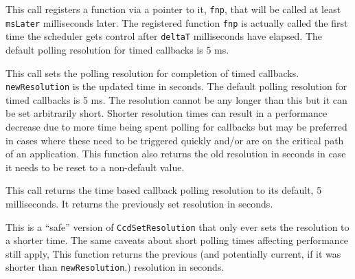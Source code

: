 This call registers a function via a pointer to it, {\tt fnp},  that will be
called at least {\tt msLater} milliseconds later. 
The registered function {\tt fnp} is actually called the first time the
scheduler gets control after {\tt deltaT} milliseconds have elapsed. 
The default polling resolution for timed callbacks is 5 ms.


This call sets the polling resolution for completion of timed callbacks.
{\tt newResolution} is the updated time in seconds. The default polling resolution
for timed callbacks is 5 ms. The resolution cannot be any longer than this but
it can be set arbitrarily short. Shorter resolution times can result in a
performance decrease due to more time being spent polling for callbacks but may be
preferred in cases where these need to be triggered quickly and/or are on the
critical path of an application.
This function also returns the old resolution in seconds in case it needs to be
reset to a non-default value.


This call returns the time based callback polling resolution to its default,
5 milliseconds. It returns the previously set resolution in seconds.


This is a ``safe'' version of {\tt CcdSetResolution} that only ever sets the
resolution to a shorter time.
The same caveats about short polling times affecting performance still apply,
This function returns the previous (and potentially current, if it was shorter
than {\tt newResolution},) resolution in seconds.

